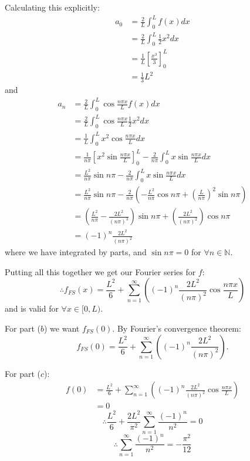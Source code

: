 \begin{enumerate}
    Calculating this explicitly:
    \begin{align*}
        a_0
        &=\frac{2}{L}\int_{0}^{L}f(x)dx \\
        &=\frac{2}{L}\int_{0}^{L}\frac{1}{2}x^2dx \\
        &=\frac{1}{L}\left[\frac{x^3}{3}\right]_{0}^{L} \\
        &=\frac{1}{3}L^2
    \end{align*}
    and
    \begin{align*}
        a_n
        &=\frac{2}{L}\int_{0}^{L}\cos\frac{n\pi x}{L}f(x)dx \\
        &=\frac{2}{L}\int_{0}^{L}\cos\frac{n\pi x}{L}\frac{1}{2}x^2dx \\
        &=\frac{1}{L}\int_{0}^{L}x^2\cos\frac{n\pi x}{L}dx \\
        &=\frac{1}{n\pi}\left[x^2\sin\frac{n\pi x}{L}\right]_{0}^{L}
        -\frac{2}{n\pi}\int_{0}^{L}x\sin\frac{n\pi x}{L}dx \\
        &=\frac{L^2}{n\pi}\sin n\pi
        -\frac{2}{n\pi}\int_{0}^{L}x\sin\frac{n\pi x}{L}dx \\
        &=\frac{L^2}{n\pi}\sin n\pi
        -\frac{2}{n\pi}\left(-\frac{L^2}{n\pi}\cos n\pi+
        \left(\frac{L}{n\pi}\right)^2\sin n\pi\right) \\
        &=\left(\frac{L^2}{n\pi}-\frac{2L^2}{(n\pi)^3}\right)\sin n\pi
        +\left(\frac{2L^2}{(n\pi)^2}\right)\cos n\pi \\
        &=(-1)^n\frac{2L^2}{(n\pi)^2}
    \end{align*}
    where we have integrated by parts, and $\sin n\pi=0$ for $\forall n\in\mathbb{N}$.

    Putting all this together we get our Fourier series for $f$:
    $$\therefore f_{FS}(x)=\frac{L^2}{6}+
    \sum_{n=1}^{\infty}\left((-1)^n\frac{2L^2}{(n\pi)^2}\cos\frac{n\pi x}{L}\right)$$
    and is valid for $\forall x\in[0,L)$.

    \newpage

    For part ($b$) we want $f_{FS}(0)$.
    By Fourier's convergence theorem:
    $$f_{FS}(0)=\frac{L^2}{6}+
    \sum_{n=1}^{\infty}\left((-1)^n\frac{2L^2}{(n\pi)^2}\right).$$

    For part ($c$):
    \begin{align*}
        f(0)
        &=\frac{L^2}{6}+
        \sum_{n=1}^{\infty}\left((-1)^n\frac{2L^2}{(n\pi)^2}\cos\frac{n\pi x}{L}\right) \\
        &=0
    \end{align*}
    $$\therefore\frac{L^2}{6}+\frac{2L^2}{\pi^2}
    \sum_{n=1}^{\infty}\frac{(-1)^n}{n^2}=0$$
    $$\therefore\sum_{n=1}^{\infty}\frac{(-1)^n}{n^2}
    =-\frac{\pi^2}{12}$$


\end{enumerate}
